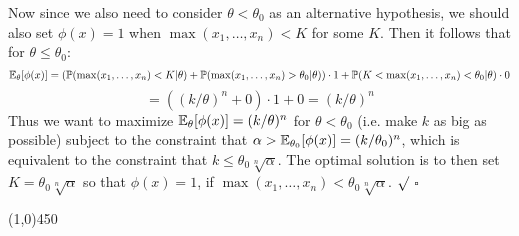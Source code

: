 \documentclass[12pt]{article}
\begin{document}
\noindent
Now since we also need to consider $\theta < \theta_0$ as an alternative hypothesis, we should also set $\phi(x) = 1$ when $\max(x_1,\dots,x_n) < K$ for some $K$. Then it follows that for $\theta \leq \theta_0$:
$$\mathbb{E}_\theta[\phi(x)] 
= (\mathbb{P}(\max(x_1,\dots,x_n) < K|\theta)+\mathbb{P}(\max(x_1,\dots,x_n) > \theta_0|\theta))\cdot 1 + \mathbb{P}(K<\max(x_1,\dots,x_n) < \theta_0|\theta)\cdot 0$$
$$= ((k/\theta)^n + 0)\cdot 1+0 = (k/\theta)^n$$
Thus we want to maximize $\mathbb{E}_\theta[\phi(x)]  = (k/\theta)^n$ for $\theta<\theta_0$ (i.e. make $k$ as big as possible) subject to the constraint that $\alpha > \mathbb{E}_{\theta_0}[\phi(x)] = (k/\theta_0)^n$, which is equivalent to the constraint that $k \leq \theta_0 \sqrt[n]{\alpha}.$ The optimal solution is to then set $K = \theta_0 \sqrt[n]{\alpha}$ so that $\phi(x) = 1$, if $\max(x_1,\dots,x_n) < \theta_0 \sqrt[n]{\alpha}$. $\surd$ $\square$

 \begin{center}
\line(1,0){450}
\end{center}
\end{document}
